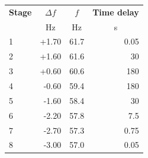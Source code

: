 \begin{tabularx}{\linewidth}{@{}l r r r@{}}
\toprule
\textbf{Stage} & \multicolumn{1}{c}{\textbf{$\Delta f$}} & \multicolumn{1}{c}{\textbf{$f$}} & \multicolumn{1}{c}{\textbf{Time delay}} \\
 & \multicolumn{1}{c}{Hz} & \multicolumn{1}{c}{Hz} & \multicolumn{1}{c}{s} \\
\midrule
1 & +1.70 & 61.7 & 0.05 \\
2 & +1.60 & 61.6 & 30 \\
3 & +0.60 & 60.6 & 180 \\
4 & -0.60 & 59.4 & 180 \\
5 & -1.60 & 58.4 & 30 \\
6 & -2.20 & 57.8 & 7.5 \\
7 & -2.70 & 57.3 & 0.75 \\
8 & -3.00 & 57.0 & 0.05 \\
\bottomrule
\end{tabularx}
